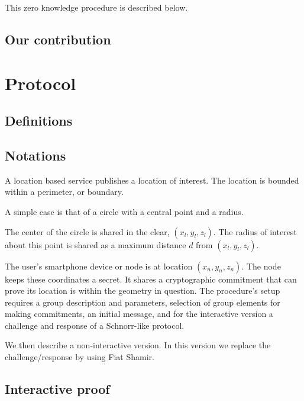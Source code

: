 \documentclass{article}
\begin{document}
This zero knowledge procedure is described below. 

\subsection{Our contribution}

\section{Protocol}
\subsection{Definitions}


\subsection{Notations}

A location based service publishes a location of interest. 
The location is bounded within a perimeter, or boundary. 

A simple case is that of a circle with a central point and a radius. 

The center of the circle is shared in the clear, $(x_l, y_l, z_l)$. 
The radius of interest about this point is shared as a maximum distance $d$ from $(x_l, y_l, z_l)$. 

The user's smartphone device or node is at location $(x_n, y_n, z_n )$. 
The node keeps these coordinates a secret. 
It shares a cryptographic commitment that can prove its location is within the geometry in question. 
The procedure's setup requires a group description and parameters, selection of group elements for making commitments,
an initial message, and for the interactive version a challenge and response of a Schnorr-like protocol.

We then describe a non-interactive version. In this version we replace the challenge/response by using Fiat Shamir. 

\subsection{Interactive proof}
\end{document}
